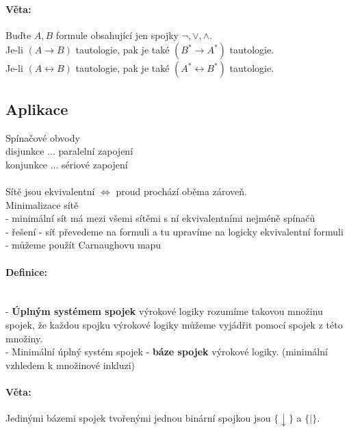 \documentclass[a4]{report}
\theoremstyle{definition}
\begin{document}
\paragraph*{Věta:}
Buďte $A, B$ formule obsahující jen spojky $\neg , \vee , \wedge $.\\
Je-li $(A \rightarrow B)$ tautologie, pak je také $(B^* \rightarrow A^* )$ tautologie.\\
Je-li $(A \leftrightarrow B)$ tautologie, pak je také $(A^* \leftrightarrow B^* )$ tautologie.

\subsection*{Aplikace}
Spínačové obvody\\
disjunkce ... paralelní zapojení\\
konjunkce ... sériové zapojení\\
~\\
Sítě jsou ekvivalentní $\Leftrightarrow $ proud prochází oběma zároveň.\\
Minimalizace sítě\\
- minimální sít má mezi všemi sítěmi s ní ekvivalentními nejméně spínačů\\
- řešení - síť převedeme na formuli a tu upravíme na logicky ekvivalentní formuli\\
- můžeme použít Carnaughovu mapu

\paragraph*{Definice:}~\\
- \textbf{Úplným systémem spojek} výrokové logiky rozumíme takovou množinu spojek, že každou spojku výrokové logiky můžeme vyjádřit pomocí spojek z této množiny.\\
- Minimální úplný systém spojek - \textbf{báze spojek} výrokové logiky. (minimální vzhledem k množinové inkluzi)

\paragraph*{Věta:}
Jedinými bázemi spojek tvořenými jednou binární spojkou jsou $ \{ \downarrow \} $ a $ \{ \mid \} $.
\end{document}
